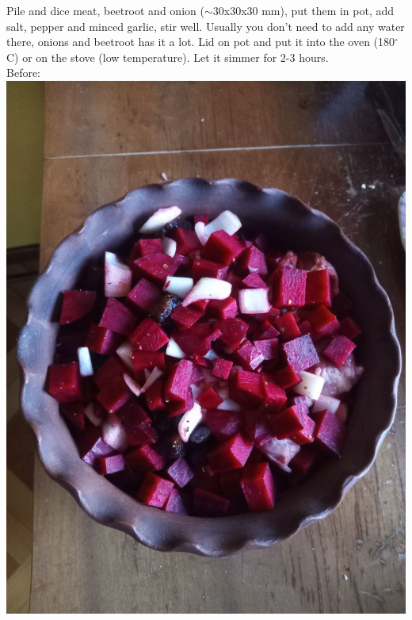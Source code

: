\documentclass[11pt,a4paper]{article}
\begin{document}
Pile and dice meat, beetroot and onion (${\sim}$30x30x30 mm), put them in pot, add salt, pepper and minced garlic, stir well. Usually you don't need to add any water there, onions and beetroot has it a lot. Lid on pot and put it into the oven (180$^{\circ}$ C) or on the stove (low temperature). Let it simmer for 2-3 hours. \\

Before: \\ 
\includegraphics[scale=0.25]{shpundra_1.jpg} \\
\end{document}
